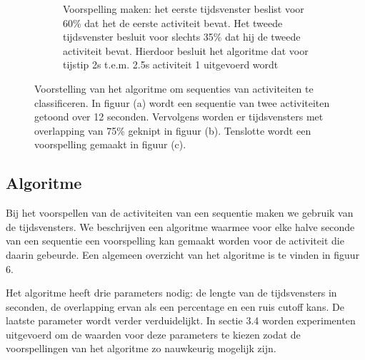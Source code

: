 \documentclass{article}
\begin{document}
\begin{figure}
\begin{subfigure}[b]{.90\linewidth}
\caption{Voorspelling maken: het eerste tijdsvenster beslist voor 60\% dat het de eerste activiteit bevat. Het tweede tijdsvenster besluit voor slechts 35\% dat hij de tweede activiteit bevat. Hierdoor besluit het algoritme dat voor tijstip 2s t.e.m. 2.5s activiteit 1 uitgevoerd wordt}

\end{subfigure}
  \caption{Voorstelling van het algoritme om sequenties van activiteiten te classificeren. In figuur (a) wordt een sequentie van twee activiteiten getoond over 12 seconden. Vervolgens worden er tijdsvensters met overlapping van 75\% geknipt in figuur (b). Tenslotte wordt een voorspelling gemaakt in figuur (c).}\label{fig:algoritme}

\end{figure}

\subsection{Algoritme}

Bij het voorspellen van de activiteiten van een sequentie maken we gebruik van de tijdsvensters. We beschrijven een algoritme waarmee voor elke halve seconde van een sequentie een voorspelling kan gemaakt worden voor de activiteit die daarin gebeurde. Een algemeen overzicht van het algoritme is te vinden in figuur 6.

Het algoritme heeft drie parameters nodig: de lengte van de tijdsvensters in seconden, de overlapping ervan als een percentage en een ruis cutoff kans. De laatste parameter wordt verder verduidelijkt. In sectie 3.4 worden experimenten uitgevoerd om de waarden voor deze parameters te kiezen zodat de voorspellingen van het algoritme zo nauwkeurig mogelijk zijn.
\end{document}
